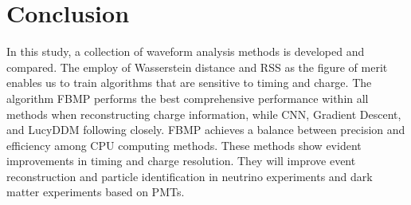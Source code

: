 \section{Conclusion} %
\label{sec:conclusion}

In this study, a collection of waveform analysis methods is developed and compared. The employ of Wasserstein distance and RSS as the figure of merit enables us to train algorithms that are sensitive to timing and charge. The algorithm FBMP performs the best comprehensive performance within all methods when reconstructing charge information, while CNN, Gradient Descent, and LucyDDM following closely. FBMP achieves a balance between precision and efficiency among CPU computing methods. These methods show evident improvements in timing and charge resolution. They will improve event reconstruction and particle identification in neutrino experiments and dark matter experiments based on PMTs. 

